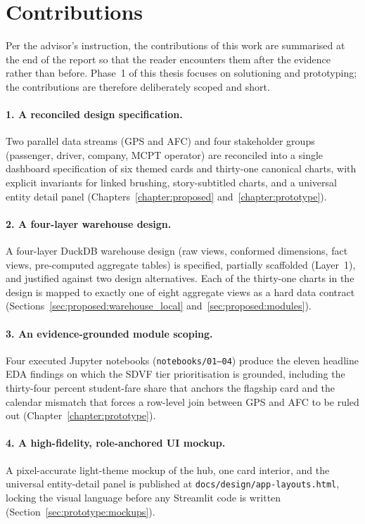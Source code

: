 \section{Contributions}
\label{sec:conclusion:contributions}

Per the advisor's instruction, the contributions of this work
are summarised at the end of the report so that the reader
encounters them after the evidence rather than before.
Phase~1 of this thesis focuses on solutioning and prototyping;
the contributions are therefore deliberately scoped and short.

\paragraph{1. A reconciled design specification.}
Two parallel data streams (GPS and AFC) and four stakeholder
groups (passenger, driver, company, MCPT operator) are
reconciled into a single dashboard specification of six themed
cards and thirty-one canonical charts, with explicit invariants
for linked brushing, story-subtitled charts, and a universal
entity detail panel
(Chapters~\ref{chapter:proposed} and~\ref{chapter:prototype}).

\paragraph{2. A four-layer warehouse design.}
A four-layer DuckDB warehouse design (raw views, conformed
dimensions, fact views, pre-computed aggregate tables) is
specified, partially scaffolded (Layer~1), and justified
against two design alternatives. Each of the thirty-one charts
in the design is mapped to exactly one of eight aggregate views
as a hard data contract
(Sections~\ref{sec:proposed:warehouse_local}
and~\ref{sec:proposed:modules}).

\paragraph{3. An evidence-grounded module scoping.}
Four executed Jupyter notebooks (\texttt{notebooks/01--04})
produce the eleven headline EDA findings on which the SDVF
tier prioritisation is grounded, including the thirty-four
percent student-fare share that anchors the flagship card and
the calendar mismatch that forces a row-level join between GPS
and AFC to be ruled out
(Chapter~\ref{chapter:prototype}).

\paragraph{4. A high-fidelity, role-anchored UI mockup.}
A pixel-accurate light-theme mockup of the hub, one card
interior, and the universal entity-detail panel is published
at \texttt{docs/design/app-layouts.html}, locking the visual
language before any Streamlit code is written
(Section~\ref{sec:prototype:mockups}).

